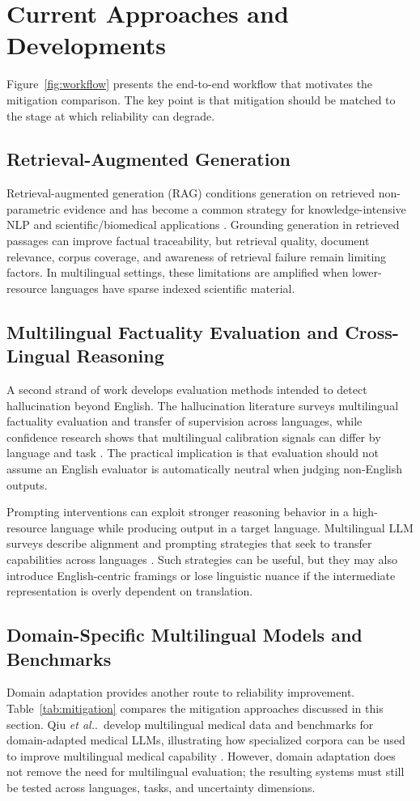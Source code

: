 \documentclass[acmsmall,nonacm]{acmart}
\newcommand{\etal}{\textit{et al.}}
\begin{document}
\section{Current Approaches and Developments}\label{sec:approaches}
Figure~\ref{fig:workflow} presents the end-to-end workflow that motivates the mitigation comparison. The key point is that mitigation should be matched to the stage at which reliability can degrade.

\subsection{Retrieval-Augmented Generation}
Retrieval-augmented generation (RAG) conditions generation on retrieved non-parametric evidence and has become a common strategy for knowledge-intensive NLP and scientific/biomedical applications \cite{Lewis2020}. Grounding generation in retrieved passages can improve factual traceability, but retrieval quality, document relevance, corpus coverage, and awareness of retrieval failure remain limiting factors. In multilingual settings, these limitations are amplified when lower-resource languages have sparse indexed scientific material.

\subsection{Multilingual Factuality Evaluation and Cross-Lingual Reasoning}
A second strand of work develops evaluation methods intended to detect hallucination beyond English. The hallucination literature surveys multilingual factuality evaluation and transfer of supervision across languages, while confidence research shows that multilingual calibration signals can differ by language and task \cite{Huang2025,Xue2024}. The practical implication is that evaluation should not assume an English evaluator is automatically neutral when judging non-English outputs.

Prompting interventions can exploit stronger reasoning behavior in a high-resource language while producing output in a target language. Multilingual LLM surveys describe alignment and prompting strategies that seek to transfer capabilities across languages \cite{Qin2025}. Such strategies can be useful, but they may also introduce English-centric framings or lose linguistic nuance if the intermediate representation is overly dependent on translation.

\subsection{Domain-Specific Multilingual Models and Benchmarks}
Domain adaptation provides another route to reliability improvement. Table~\ref{tab:mitigation} compares the mitigation approaches discussed in this section. Qiu \etal.\ develop multilingual medical data and benchmarks for domain-adapted medical LLMs, illustrating how specialized corpora can be used to improve multilingual medical capability \cite{Qiu2024}. However, domain adaptation does not remove the need for multilingual evaluation; the resulting systems must still be tested across languages, tasks, and uncertainty dimensions.
\end{document}
